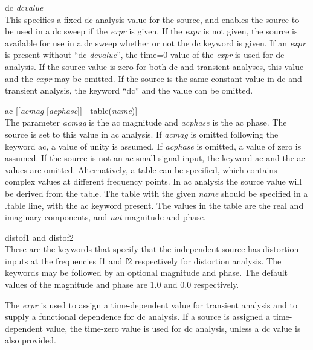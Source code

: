 \begin{description}
\item{{\vt dc} {\it dcvalue}}\\
This specifies a fixed dc analysis value for the source, and enables
the source to be used in a dc sweep if the {\it expr} is given.  If
the {\it expr} is not given, the source is available for use in a dc
sweep whether or not the {\vt dc} keyword is given.  If an {\it expr}
is present without ``{\vt dc} {\it dcvalue\/}'', the time=0 value of
the {\it expr} is used for dc analysis.  If the source value is zero
for both dc and transient analyses, this value and the {\it expr\/}
may be omitted.  If the source is the same constant value in dc and
transient analysis, the keyword ``{\vt dc}'' and the value can be
omitted.

\item{{\vt ac} [[{\it acmag} [{\it acphase}]] $|$ table({\it name\/})]}\\
The parameter {\it acmag} is the ac magnitude and {\it acphase} is the
ac phase.  The source is set to this value in ac analysis.  If {\it
acmag} is omitted following the keyword {\vt ac}, a value of unity is
assumed.  If {\it acphase} is omitted, a value of zero is assumed.  If
the source is not an ac small-signal input, the keyword {\vt ac} and
the ac values are omitted.  Alternatively, a table can be specified,
which contains complex values at different frequency points.  In ac
analysis the source value will be derived from the table.  The table
with the given {\it name} should be specified in a {\vt .table} line,
with the {\vt ac} keyword present.  The values in the table are the
real and imaginary components, and {\it not} magnitude and phase.

\item{{\vt distof1} and {\vt distof2}}\\
These are the keywords that specify that the independent source has
distortion inputs at the frequencies f1 and f2 respectively for
distortion analysis.  The keywords may be followed by an optional
magnitude and phase.  The default values of the magnitude and phase
are 1.0 and 0.0 respectively.
\end{description}

The {\it expr} is used to assign a time-dependent value for
transient analysis and to supply a functional dependence for dc
analysis.  If a source is assigned a time-dependent value, the
time-zero value is used for dc analysis, unless a dc value is also
provided.


